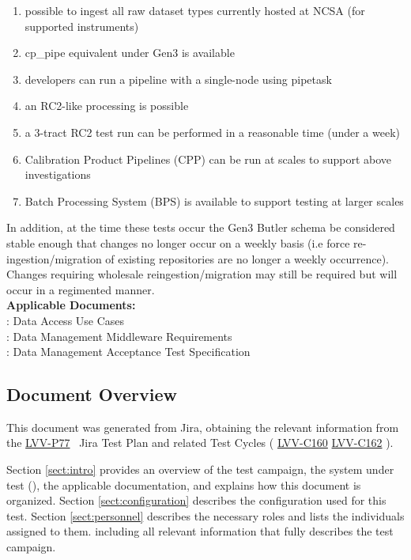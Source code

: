 \documentclass[DM,lsstdraft,STR,toc]{lsstdoc}
\providecommand{\tightlist}{
  \setlength{\itemsep}{0pt}\setlength{\parskip}{0pt}}
\begin{document}
\begin{enumerate}
\tightlist
\item
  possible to ingest all raw dataset types currently hosted at NCSA (for
  supported instruments)
\item
  cp\_pipe equivalent under Gen3 is available
\item
  developers can run a pipeline with a single-node using pipetask
\item
  an RC2-like processing is possible
\item
  a 3-tract RC2 test run can be performed in a reasonable time (under a
  week)
\item
  Calibration Product Pipelines (CPP) can be run at scales to support
  above investigations
\item
  Batch Processing System (BPS) is available to support testing at
  larger scales
\end{enumerate}

In addition, at the time these tests occur the Gen3 Butler schema be
considered stable enough that changes no longer occur on a weekly basis
(i.e force re-ingestion/migration of existing repositories are no longer
a weekly occurrence). Changes requiring wholesale reingestion/migration
may still be required but will occur in a regimented
manner.\\[2\baselineskip]\textbf{Applicable Documents:}\\
: Data Access Use Cases\\
: Data Management Middleware Requirements\\
: Data Management Acceptance Test Specification\\[2\baselineskip]


\subsection{Document Overview}
\label{sect:docoverview}

This document was generated from Jira, obtaining the relevant information from the 
\href{https://jira.lsstcorp.org/secure/Tests.jspa#/testPlan/LVV-P77}{LVV-P77}
~Jira Test Plan and related Test Cycles (
  \href{https://jira.lsstcorp.org/secure/Tests.jspa#/testCycle/LVV-C160}{LVV-C160}
  \href{https://jira.lsstcorp.org/secure/Tests.jspa#/testCycle/LVV-C162}{LVV-C162}
).

Section \ref{sect:intro} provides an overview of the test campaign, the system under test (\product{}),
the applicable documentation, and explains how this document is organized.
Section \ref{sect:configuration}  describes the configuration used for this test.
Section \ref{sect:personnel} describes the necessary roles and lists the individuals assigned to them.
including all relevant information that fully describes the test campaign.
\end{document}
